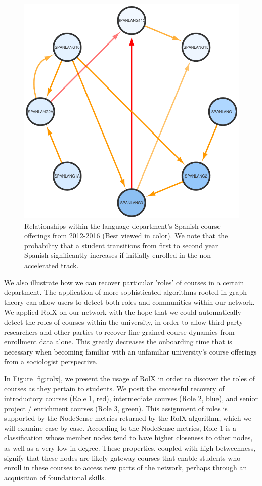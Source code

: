 \documentclass{sigchi}
\begin{document}
\begin{figure}[h]
    \centering
    \includegraphics[width=0.4\columnwidth]{final-spanlang.pdf}  
    \caption{Relationships within the language department's Spanish course offerings from 2012-2016 (Best viewed in color). We note that the probability that a student transitions from first to second year Spanish significantly increases if initially enrolled in the non-accelerated track.}
    \label{fig:spanlang}
\end{figure}
We also illustrate how we can recover particular 'roles' of courses in a certain department. The application of more sophisticated algorithms rooted in graph theory can allow users to detect both roles and communities within our network. We applied RolX \cite{Henderson2012} on our network with the hope that we could automatically detect the roles of courses within the university, in order to allow third party researchers and other parties to recover fine-grained course dynamics from enrollment data alone. This greatly decreases the onboarding time that is necessary when becoming familiar with an unfamiliar university's course offerings from a sociologist perspective. 

In Figure \ref{fig:rolx}, we present the usage of RolX in order to discover the roles of courses as they pertain to students. We posit the successful recovery of introductory courses (Role 1, red), intermediate courses (Role 2, blue), and senior project / enrichment courses (Role 3, green). This assignment of roles is supported by the NodeSense metrics returned by the RolX algorithm, which we will examine case by case. According to the NodeSense metrics, Role 1 is a classification whose member nodes tend to have higher closeness to other nodes, as well as a very low in-degree. These properties, coupled with high betweenness, signify that these nodes are likely gateway courses that enable students who enroll in these courses to access new parts of the network, perhaps through an acquisition of foundational skills. 
\end{document}
